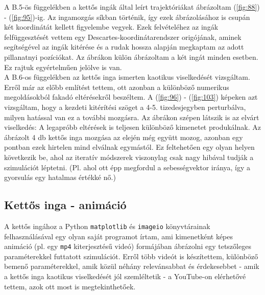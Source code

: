 \begin{multicols}{2}
A B.5-ös függelékben a kettős ingák által leírt trajektóriákat ábrázoltam (\ref{fig:88}) - (\ref{fig:95})-ig. Az ingamozgás síkban történik, így ezek ábrázolásához is csupán két koordinátát kellett figyelembe vegyek. Ezek felvételéhez az ingák felfüggesztését vettem egy Descartes-koordinátarendszer origójának, aminek segítségével az ingák kitérése és a rudak hossza alapján megkaptam az adott pillanatnyi pozíciókat. Az ábrákon külön ábrázoltam a két ingát minden esetben. Ez rajtuk egyértelműen jelölve is van. \\
A B.6-os függelékben az kettős inga ismerten kaotikus viselkedését\cite{stachowiak_okada_2006} vizsgáltam. Erről már az előbb említést tettem, ott azonban a különböző numerikus megoldásokból fakadó eltérésekről beszéltem. A (\ref{fig:96}) - (\ref{fig:103}) képeken azt vizsgáltam, hogy a kezdeti kitérítési szöget a 4-5. tizedesjegyben perturbálva, milyen hatással van ez a további mozgásra. Az ábrákon szépen látszik is az elvárt viselkedés: A legapróbb eltérések is teljesen különböző kimenetet produkálnak. Az ábrázolt 4 db kettős inga mozgása az elején még együtt mozog, azonban egy pontban ezek hirtelen mind elválnak egymástól. Ez feltehetően egy olyan helyen következik be, ahol az iteratív módszerek viszonylag csak nagy hibával tudják a szimulációt léptetni. (Pl. ahol ott épp megfordul a sebességvektor iránya, így a gyorsulás egy hatalmas értékké nő.)

\subsection{Kettős inga - animáció} \label{sub:4.3}
A kettős ingához a Python \texttt{matplotlib} és \texttt{imageio} könyvtárainak felhasználásával egy olyan saját programot írtam, ami kimenetként képes animáció (pl. egy \texttt{mp4} kiterjesztésű videó) formájában ábrázolni egy tetszőleges paraméterekkel futtatott szimulációt. Erről több videót is készítettem, különböző bemenő paraméterekkel, amik közül néhány relevánsabbat és érdekesebbet - amik a kettős inga kaotikus viselkedését jól szemléltetik - a YouTube-on elérhetővé tettem, azok ott most is megtekinthetőek\cite{yt}.


\end{multicols}
